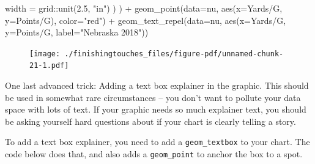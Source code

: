 \documentclass[
  letterpaper,
  DIV=11,
  numbers=noendperiod]{scrreprt}
\newenvironment{Shaded}{\begin{snugshade}}{\end{snugshade}}
\newcommand{\AttributeTok}[1]{\textcolor[rgb]{0.40,0.45,0.13}{#1}}
\newcommand{\FloatTok}[1]{\textcolor[rgb]{0.68,0.00,0.00}{#1}}
\newcommand{\FunctionTok}[1]{\textcolor[rgb]{0.28,0.35,0.67}{#1}}
\newcommand{\NormalTok}[1]{\textcolor[rgb]{0.00,0.23,0.31}{#1}}
\newcommand{\SpecialCharTok}[1]{\textcolor[rgb]{0.37,0.37,0.37}{#1}}
\newcommand{\StringTok}[1]{\textcolor[rgb]{0.13,0.47,0.30}{#1}}
\begin{document}
\begin{Shaded}
\begin{Highlighting}[]
      \AttributeTok{width =}\NormalTok{ grid}\SpecialCharTok{::}\FunctionTok{unit}\NormalTok{(}\FloatTok{2.5}\NormalTok{, }\StringTok{"in"}\NormalTok{)}
\NormalTok{    )}
\NormalTok{    ) }\SpecialCharTok{+}
  \FunctionTok{geom\_point}\NormalTok{(}\AttributeTok{data=}\NormalTok{nu, }\FunctionTok{aes}\NormalTok{(}\AttributeTok{x=}\StringTok{\textasciigrave{}}\AttributeTok{Yards/G}\StringTok{\textasciigrave{}}\NormalTok{, }\AttributeTok{y=}\StringTok{\textasciigrave{}}\AttributeTok{Points/G}\StringTok{\textasciigrave{}}\NormalTok{), }\AttributeTok{color=}\StringTok{"red"}\NormalTok{) }\SpecialCharTok{+} 
  \FunctionTok{geom\_text\_repel}\NormalTok{(}\AttributeTok{data=}\NormalTok{nu, }\FunctionTok{aes}\NormalTok{(}\AttributeTok{x=}\StringTok{\textasciigrave{}}\AttributeTok{Yards/G}\StringTok{\textasciigrave{}}\NormalTok{, }\AttributeTok{y=}\StringTok{\textasciigrave{}}\AttributeTok{Points/G}\StringTok{\textasciigrave{}}\NormalTok{, }\AttributeTok{label=}\StringTok{"Nebraska 2018"}\NormalTok{))}
\end{Highlighting}
\end{Shaded}

\begin{figure}[H]

{\centering \texttt{[image: ./finishingtouches\_files/figure-pdf/unnamed-chunk-21-1.pdf]}

}

\end{figure}

One last advanced trick: Adding a text box explainer in the graphic.
This should be used in somewhat rare circumstances -- you don't want to
pollute your data space with lots of text. If your graphic needs so much
explainer text, you should be asking yourself hard questions about if
your chart is clearly telling a story.

To add a text box explainer, you need to add a \texttt{geom\_textbox} to
your chart. The code below does that, and also adds a
\texttt{geom\_point} to anchor the box to a spot.
\end{document}
